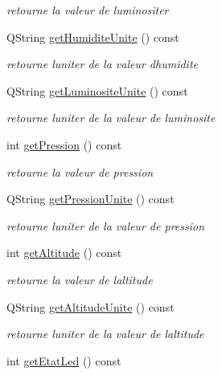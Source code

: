 \begin{DoxyCompactItemize}
\begin{DoxyCompactList}\small\item\em retourne la valeur de luminositer \end{DoxyCompactList}\item 
Q\+String \hyperlink{class_esp32_ab2a1fc92c11af031814569f3d2836f33}{get\+Humidite\+Unite} () const 
\begin{DoxyCompactList}\small\item\em retourne l\textquotesingle{}uniter de la valeur d\textquotesingle{}humidite \end{DoxyCompactList}\item 
Q\+String \hyperlink{class_esp32_a50f4ef373379d2dbc0fd960438ab6f93}{get\+Luminosite\+Unite} () const 
\begin{DoxyCompactList}\small\item\em retourne l\textquotesingle{}uniter de la valeur de luminosite \end{DoxyCompactList}\item 
int \hyperlink{class_esp32_a31155a36108b37febae371d9ae65385a}{get\+Pression} () const 
\begin{DoxyCompactList}\small\item\em retourne la valeur de pression \end{DoxyCompactList}\item 
Q\+String \hyperlink{class_esp32_a398d4a1cbc61f7af2f3af7ecbcf2f93f}{get\+Pression\+Unite} () const 
\begin{DoxyCompactList}\small\item\em retourne l\textquotesingle{}uniter de la valeur de pression \end{DoxyCompactList}\item 
int \hyperlink{class_esp32_a31b691e6c75c1f9859bde4c0df8fe12f}{get\+Altitude} () const 
\begin{DoxyCompactList}\small\item\em retourne la valeur de l\textquotesingle{}altitude \end{DoxyCompactList}\item 
Q\+String \hyperlink{class_esp32_aad3c2e4b5d15a02abc62d0329f43942d}{get\+Altitude\+Unite} () const 
\begin{DoxyCompactList}\small\item\em retourne l\textquotesingle{}uniter de la valeur de l\textquotesingle{}altitude \end{DoxyCompactList}\item 
int \hyperlink{class_esp32_ac695656654b5d83ec3924b47f533f465}{get\+Etat\+Led} () const 

\end{DoxyCompactItemize}
